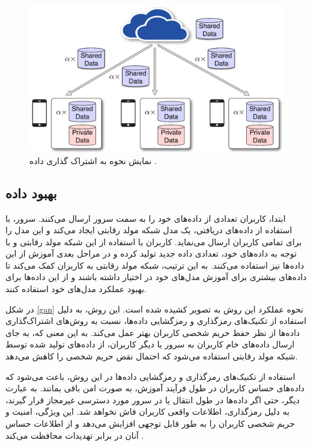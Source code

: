  \begin{figure}[t]
	\centering
	\includegraphics[scale=0.9]{images/chap3/share_data.png}%
	\caption{%
		نمایش نحوه به اشتراک‌ گذاری داده
		\cite{zhao2018federated}%
		.
	}
	\label{share_data}
	\centering
\end{figure}


\subsection{
	بهبود داده%
\protect
{}
}
ابتدا، کاربران تعدادی از داده‌های خود را به سمت سرور ارسال می‌کنند. سرور، با استفاده از داده‌های دریافتی، یک مدل شبکه مولد رقابتی%
ایجاد می‌کند و این مدل را برای تمامی کاربران ارسال می‌نماید. کاربران با استفاده از این شبکه مولد رقابتی و با توجه به داده‌های خود، تعدادی داده جدید تولید کرده و در مراحل بعدی آموزش از این داده‌ها نیز استفاده می‌کنند. به این ترتیب، شبکه مولد رقابتی به کاربران کمک می‌کند تا داده‌های بیشتری برای آموزش مدل‌های خود در اختیار داشته باشند و از این داده‌ها برای بهبود عملکرد مدل‌های خود استفاده کنند.

در شکل
\ref{gan}%
نحوه عملکرد این روش به تصویر کشیده شده است. این روش، به دلیل استفاده از تکنیک‌های رمزگذاری%
و رمزگشایی%
داده‌ها، نسبت به روش‌های اشتراک‌گذاری داده‌ها از نظر حفظ حریم شخصی کاربران بهتر عمل می‌کند. به این معنی که، به جای ارسال داده‌های خام کاربران به سرور یا دیگر کاربران، از داده‌های تولید شده توسط شبکه مولد رقابتی استفاده می‌شود که احتمال نقض حریم شخصی را کاهش می‌دهد.

استفاده از تکنیک‌های رمزگذاری و رمزگشایی داده‌ها در این روش، باعث می‌شود که داده‌های حساس کاربران در طول فرآیند آموزش، به صورت امن باقی بمانند. به عبارت دیگر، حتی اگر داده‌ها در طول انتقال یا در سرور مورد دسترسی غیرمجاز قرار گیرند، به دلیل رمزگذاری، اطلاعات واقعی کاربران فاش نخواهد شد. این ویژگی، امنیت و حریم شخصی کاربران را به طور قابل توجهی افزایش می‌دهد و از اطلاعات حساس آنان در برابر تهدیدات محافظت می‌کند
\cite{jeong2018communication}.

